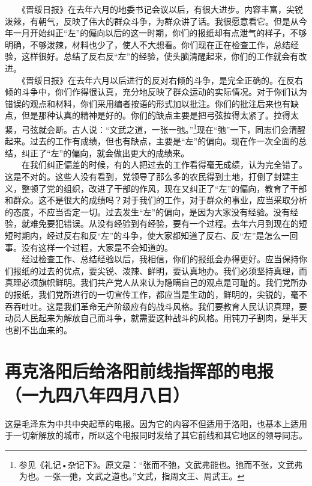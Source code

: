 \documentclass[cn,11pt,chinese]{elegantbook}
\def\myformat#1{\hfil\hfil #1}
\begin{document}
　　《晋绥日报》在去年六月的地委书记会议以后，有很大进步。内容丰富，尖锐泼辣，有朝气，反映了伟大的群众斗争，为群众讲了话。我很愿意看它。但是从今年一月开始纠正“左”的偏向以后的这一时期，你们的报纸却有点泄气的样子，不够明确，不够泼辣，材料也少了，使人不大想看。你们现在正在检查工作，总结经验，这样很好。总结了反右反“左”的经验，使头脑清醒起来，你们的工作就会有改进。\\
　　《晋绥日报》在去年六月以后进行的反对右倾的斗争，是完全正确的。在反右倾的斗争中，你们作得很认真，充分地反映了群众运动的实际情况。对于你们认为错误的观点和材料，你们采用编者按语的形式加以批注。你们的批注后来也有缺点，但是那种认真的精神是好的。你们的缺点主要是把弓弦拉得太紧了。拉得太紧，弓弦就会断。古人说：“文武之道，一张一弛。”\footnote[3]{ 参见《礼记•杂记下》。原文是：“张而不弛，文武弗能也。弛而不张，文武弗为也。一张一弛，文武之道也。”文武，指周文王、周武王。}现在“弛”一下，同志们会清醒起来。过去的工作有成绩，但也有缺点，主要是“左”的偏向。现在作一次全面的总结，纠正了“左”的偏向，就会做出更大的成绩来。\\
　　在我们纠正偏差的时候，有的人把过去的工作看得毫无成绩，认为完全错了。这是不对的。这些人没有看到，党领导了那么多的农民得到土地，打倒了封建主义，整顿了党的组织，改进了干部的作风，现在又纠正了“左”的偏向，教育了干部和群众。这不是很大的成绩吗？对于我们的工作，对于群众的事业，应当采取分析的态度，不应当否定一切。过去发生“左”的偏向，是因为大家没有经验。没有经验，就难免要犯错误。从没有经验到有经验，要有一个过程。去年六月到现在的短短时期内，经过反右和反“左”的斗争，使大家都知道了反右、反“左”是怎么一回事。没有这样一个过程，大家是不会知道的。\\
　　经过检查工作、总结经验以后，我相信，你们的报纸会办得更好。应当保持你们报纸的过去的优点，要尖锐、泼辣、鲜明，要认真地办。我们必须坚持真理，而真理必须旗帜鲜明。我们共产党人从来认为隐瞒自己的观点是可耻的。我们党所办的报纸，我们党所进行的一切宣传工作，都应当是生动的，鲜明的，尖锐的，毫不吞吞吐吐。这是我们革命无产阶级应有的战斗风格。我们要教育人民认识真理，要动员人民起来为解放自己而斗争，就需要这种战斗的风格。用钝刀子割肉，是半天也割不出血来的。\\
\newpage\section*{\myformat{再克洛阳后给洛阳前线指挥部的电报}\\\myformat{（一九四八年四月八日）}}
\begin{introduction}\item  这是毛泽东为中共中央起草的电报。因为它的内容不但适用于洛阳，也基本上适用于一切新解放的城市，所以这个电报同时发给了其它前线和其它地区的领导同志。\end{introduction}
\end{document}
